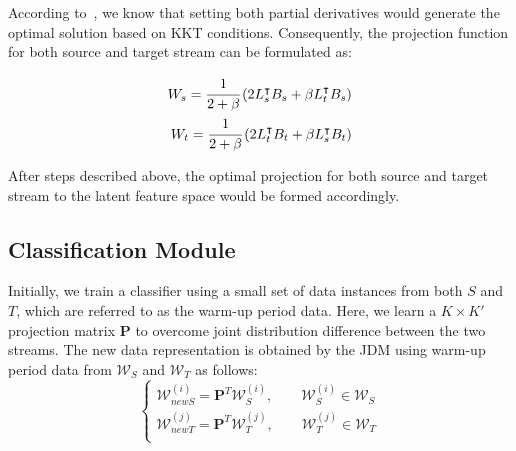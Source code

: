 According to~\cite{long2008general}, we know that setting both partial derivatives would generate the optimal solution based on KKT conditions.
Consequently, the projection function for both source and target stream can be formulated as:

\begin{equation}
\begin{split}
    W_s = \cfrac{1}{2+\beta}\left(2 L_{s}^\intercal B_{s} + \beta L_{t}^\intercal B_{s}\right) \\
    W_t = \cfrac{1}{2+\beta}\left(2 L_{t}^\intercal B_{t} + \beta L_{s}^\intercal B_{t}\right) \\
\end{split}
\end{equation}

After steps described above, the optimal projection for both source and target stream to the latent feature space would be formed accordingly. 



\subsection{Classification Module}
Initially, we train a classifier using a small set of data instances from both $S$ and $T$, which are referred to as the warm-up period data. Here, we learn a $K\times K'$ projection matrix $\mathbf{P}$ to overcome joint distribution difference between the two streams. The new data representation is obtained by the JDM using warm-up period data from $\mathcal{W}_S$ and $\mathcal{W}_T$ as follows:
\begin{equation}
\begin{cases}
\mathcal{W}_{newS}^{(i)}=\mathbf{P}^T\mathcal{W}_S^{(i)}, \qquad \mathcal{W}_S^{(i)}\in \mathcal{W}_S \\
\mathcal{W}_{newT}^{(j)}=\mathbf{P}^T\mathcal{W}_T^{(j)}, \qquad \mathcal{W}_T^{(j)}\in \mathcal{W}_T\\
\end{cases}
\end{equation}


